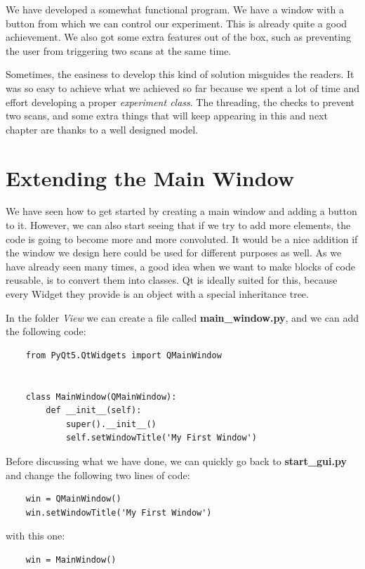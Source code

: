 We have developed a somewhat functional program. We have a window with a button from which we can control our experiment. This is already quite a good achievement. We also got some extra features out of the box, such as preventing the user from triggering two scans at the same time.

Sometimes, the easiness to develop this kind of solution misguides the readers. It was so easy to achieve what we achieved so far because we spent a lot of time and effort developing a proper \emph{experiment class}. The threading, the checks to prevent two scans, and some extra things that will keep appearing in this and next chapter are thanks to a well designed model.


\section{Extending the Main Window}\label{sec:extending-main-window}
We have seen how to get started by creating a main window and adding a button to it. However, we can also start seeing that if we try to add more elements, the code is going to become more and more convoluted. It would be a nice addition if the window we design here could be used for different purposes as well. As we have already seen many times, a good idea when we want to make blocks of code reusable, is to convert them into classes. Qt is ideally suited for this, because every Widget they provide is an object with a special inheritance tree.

In the folder \emph{View} we can create a file called \textbf{main\_window.py}, and we can add the following code:

\begin{verbatim}
    from PyQt5.QtWidgets import QMainWindow


    class MainWindow(QMainWindow):
        def __init__(self):
            super().__init__()
            self.setWindowTitle('My First Window')
\end{verbatim}

Before discussing what we have done, we can quickly go back to \textbf{start\_gui.py} and change the following two lines of code:

\begin{verbatim}
    win = QMainWindow()
    win.setWindowTitle('My First Window')
\end{verbatim}

with this one:

\begin{verbatim}
    win = MainWindow()
\end{verbatim}

